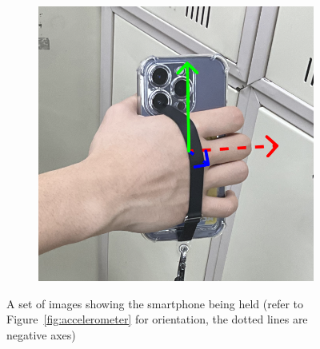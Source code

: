 \documentclass{article}
\begin{document}
\begin{figure}[h]
\begin{subfigure}{0.33\textwidth}
        \label{fig:grip_2}
    \end{subfigure}%
    \begin{subfigure}{0.33\textwidth}
        \centering
        \includegraphics[width=\textwidth]{2_3_3_3.png}
        \label{fig:grip_3}
    \end{subfigure}
    \caption{A set of images showing the smartphone being held (refer to Figure~\ref{fig:accelerometer} for orientation, the dotted lines are negative axes)}
    \label{fig:phone_grips}
\end{figure}
\end{document}
